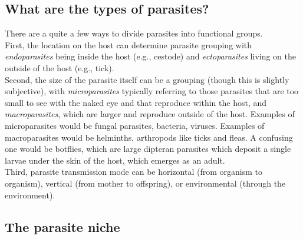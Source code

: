 \documentclass[12pt]{article}
\begin{document}
\subsection*{What are the types of parasites?}

There are a quite a few ways to divide parasites into functional groups. \\

First, the location on the host can determine parasite grouping with \textit{endoparasites} being inside the host (e.g., cestode) and \textit{ectoparasites} living on the outside of the host (e.g., tick). \\

Second, the size of the parasite itself can be a grouping (though this is slightly subjective), with \textit{microparasites} typically referring to those parasites that are too small to see with the naked eye and that reproduce within the host, and \textit{macroparasites}, which are larger and reproduce outside of the host. Examples of microparasites would be fungal parasites, bacteria, viruses. Examples of macroparasites would be helminths, arthropods like ticks and fleas. A confusing one would be botflies, which are large dipteran parasites which deposit a single larvae under the skin of the host, which emerges as an adult. \\ 


Third, parasite transmission mode can be horizontal (from organism to organism), vertical (from mother to offspring), or environmental (through the environment). \\













\bigskip
\subsection*{The parasite niche}
\end{document}
